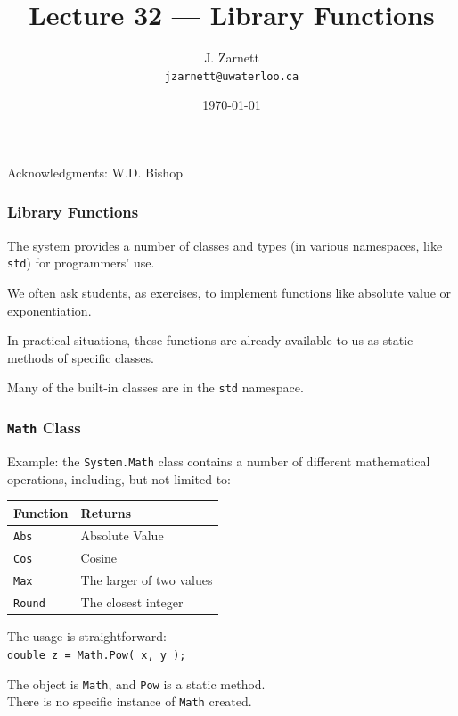 

\title{Lecture 32 --- Library Functions }

\author{J. Zarnett\\
\texttt{jzarnett@uwaterloo.ca}}
\date{\today}



\begin{frame}
  \titlepage
  
  \begin{center}
  \small{Acknowledgments: W.D. Bishop}
  \end{center}
\end{frame}


\begin{frame}
\frametitle{Library Functions}
The system provides a number of classes and types (in various namespaces, like \texttt{std}) for programmers' use.

We often ask students, as exercises, to implement functions like absolute value or exponentiation.

In practical situations, these functions are already available to us as static methods of specific classes.

Many of the built-in classes are in the \texttt{std} namespace.

\end{frame}

\begin{frame}
\frametitle{\texttt{Math} Class}
Example: the \texttt{System.Math} class contains a number of different mathematical operations, including, but not limited to:

\begin{center}
\begin{tabular}{l l}
\textbf{Function} & \textbf{Returns}\\ \hline
\texttt{Abs} & Absolute Value\\
\texttt{Cos} & Cosine\\
\texttt{Max} & The larger of two values\\
\texttt{Round} & The closest integer\\
\end{tabular}
\end{center}

The usage is straightforward:\\
\quad \texttt{double z = Math.Pow( x, y );}

The object is \texttt{Math}, and \texttt{Pow} is a static method. \\
\quad There is no specific instance of \texttt{Math} created.

\end{frame}

